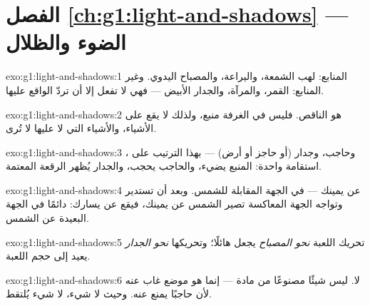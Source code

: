 \section*{الفصل \ref{ch:g1:light-and-shadows} --- الضوء والظلال}

\begin{solution}{exo:g1:light-and-shadows:1}
المنابع: لهب الشمعة، واليراعة، والمصباح اليدوي. وغير المنابع:
القمر، والمرآة، والجدار الأبيض --- فهي لا تفعل إلا أن تردّ 
الواقع عليها.
\end{solution}

\begin{solution}{exo:g1:light-and-shadows:2}
 هو الناقص. فليس في الغرفة منبع، ولذلك لا يقع  على
الأشياء، والأشياء التي لا  عليها لا تُرى.
\end{solution}

\begin{solution}{exo:g1:light-and-shadows:3}
، وحاجب، وجدار (أو حاجز أو أرض) --- بهذا الترتيب على
استقامة واحدة: المنبع يضيء، والحاجب يحجب، والجدار يُظهر الرقعة
المعتمة.
\end{solution}

\begin{solution}{exo:g1:light-and-shadows:4}
 عن يمينك --- في الجهة المقابلة للشمس. وبعد أن تستدير
وتواجه الجهة المعاكسة تصير الشمس عن يمينك، فيقع  عن يسارك:
دائمًا في الجهة البعيدة عن الشمس.
\end{solution}

\begin{solution}{exo:g1:light-and-shadows:5}
تحريك اللعبة \emph{نحو المصباح} يجعل  هائلًا؛ وتحريكها
\emph{نحو الجدار} يعيد  إلى حجم اللعبة.
\end{solution}

\begin{solution}{exo:g1:light-and-shadows:6}
لا.  ليس شيئًا مصنوعًا من مادة --- إنما هو موضع غاب عنه
 لأن حاجبًا يمنع  عنه. وحيث لا شيء، لا شيء يُلتقط.
\end{solution}


